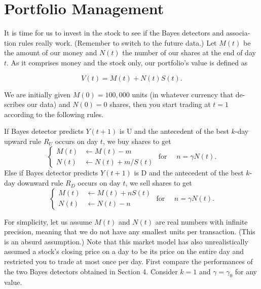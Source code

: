\documentclass[runningheads]{llncs}
\begin{document}
\section{Portfolio Management}\label{sec:6}

It is time for us to invest in the stock to see if the Bayes detectors and associa- tion rules really work. (Remember to switch to the future data.)
Let $M(t)$ be the amount of our money and $N(t)$ the number of our shares at the end of day $t$. As it comprises money and the stock only, our portfolio's value is defined as

\begin{equation}
    V(t)=M(t)+N(t)S(t).
\end{equation}

We are initially given $M(0) = 100,000$ units (in whatever currency that de- scribes our data) and $N(0) = 0$ shares, then you start trading at $t = 1$ according to the following rules.

If Bayes detector predicts $Y(t+1)$ is U and the antecedent of the best $k$-day upward rule $R_U$ occurs on day $t$, we buy shares to get
\begin{equation}\label{eq:61}
    \begin{cases}
        M(t) &\leftarrow M(t)-m \\
        N(t) &\leftarrow N(t)+m / S(t)
    \end{cases}
    \text { for } \quad n=\gamma N(t) .
\end{equation}
Else if Bayes detector predicts $Y(t+1)$ is D and the antecedent of the best $k$-day downward rule $R_D$ occurs on day $t$, we sell shares to get
\begin{equation}\label{eq:62}
    \begin{cases}
        M(t) &\leftarrow M(t)+n S(t) \\
        N(t) &\leftarrow N(t)-n
    \end{cases}
    \text { for } \quad n=\gamma N(t) .
\end{equation}

For simplicity, let us assume $M(t)$ and $N(t)$ are real numbers with infinite precision, meaning that we do not have any smallest units per transaction. (This is an absurd assumption.) Note that this market model has also unrealistically assumed a stock’s closing price on a day to be its price on the entire day and restricted you to trade at most once per day.
First compare the performances of the two Bayes detectors obtained in Section 4. Consider $k = 1$ and $\gamma = \gamma_0$ for any value.
\end{document}
